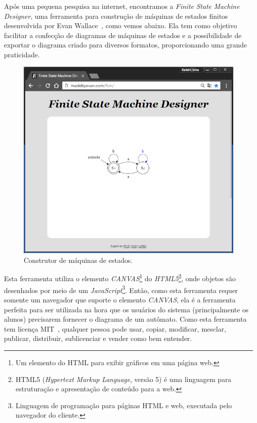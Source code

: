 \documentclass[
	12pt,				%
	openany,
	oneside,
	a4paper,			%
	english,			%
	brazil				%
	]{abntex2}
\begin{document}
  Após uma pequena pesquisa na internet, encontramos a \textit{Finite State Machine Designer}, uma ferramenta para construção de máquinas de estados finitos desenvolvida por Evan Wallace~\cite{evan}, como vemos abaixo. Ela tem como objetivo facilitar a confecção de diagramas de máquinas de estados e a possibilidade de exportar o diagrama criado para diversos formatos, proporcionando uma grande praticidade.

  \begin{figure}[H]
    \centering
    \includegraphics[scale=0.8]{fsm_page.png}  %
    \caption{Construtor de máquinas de estados.}
    \label{fig:evan01}
  \end{figure}

  Esta ferramenta utiliza o elemento \textit{CANVAS}\footnote{Um elemento do HTML para exibir gráficos em uma página web.} do \textit{HTML5}\footnote{HTML5 (\textit{Hypertext Markup Language}, versão 5) é uma linguagem para estruturação e apresentação de conteúdo para a web.}, onde objetos são desenhados por meio de um \textit{JavaScript}\footnote{Linguagem de programação para páginas HTML e web, executada pelo navegador do cliente.}. Então, como esta ferramenta requer somente um navegador que suporte o elemento \textit{CANVAS}, ela é a ferramenta perfeita para ser utilizada na hora que os usuários do sistema (principalmente os alunos) precisarem fornecer o diagrama de um autômato. Como esta ferramenta tem licença MIT~\cite{mit}, qualquer pessoa pode usar, copiar, modificar, mesclar, publicar, distribuir, sublicenciar e vender como bem entender.
\end{document}
